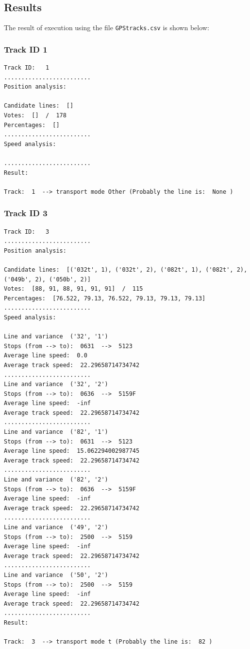 \documentclass{article}
\begin{document}
\subsection{Results}
The result of execution using the file \texttt{GPStracks.csv} is shown below: 
\subsubsection{Track ID 1}
\begin{verbatim}
Track ID:   1
.........................
Position analysis: 

Candidate lines:  [] 
Votes:  []  /  178
Percentages:  []
.........................
Speed analysis: 

.........................
Result: 

Track:  1  --> transport mode Other (Probably the line is:  None )
\end{verbatim}
\subsubsection{Track ID 3}
\begin{verbatim}
Track ID:   3
.........................
Position analysis: 

Candidate lines:  [('032t', 1), ('032t', 2), ('082t', 1), ('082t', 2), ('049b', 2), ('050b', 2)] 
Votes:  [88, 91, 88, 91, 91, 91]  /  115
Percentages:  [76.522, 79.13, 76.522, 79.13, 79.13, 79.13]
.........................
Speed analysis: 

Line and variance  ('32', '1') 
Stops (from --> to):  0631  -->  5123
Average line speed:  0.0
Average track speed:  22.29658714734742
.........................
Line and variance  ('32', '2') 
Stops (from --> to):  0636  -->  5159F
Average line speed:  -inf
Average track speed:  22.29658714734742
.........................
Line and variance  ('82', '1') 
Stops (from --> to):  0631  -->  5123
Average line speed:  15.062294002987745
Average track speed:  22.29658714734742
.........................
Line and variance  ('82', '2') 
Stops (from --> to):  0636  -->  5159F
Average line speed:  -inf
Average track speed:  22.29658714734742
.........................
Line and variance  ('49', '2') 
Stops (from --> to):  2500  -->  5159
Average line speed:  -inf
Average track speed:  22.29658714734742
.........................
Line and variance  ('50', '2') 
Stops (from --> to):  2500  -->  5159
Average line speed:  -inf
Average track speed:  22.29658714734742
.........................
Result: 

Track:  3  --> transport mode t (Probably the line is:  82 )
\end{verbatim}
\end{document}
